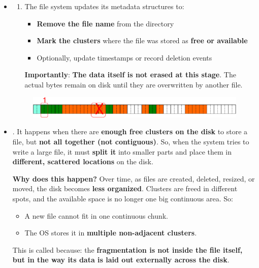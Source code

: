 \begin{itemize}
    \item {}
    \begin{enumerate}
        \item The file system updates its metadata structures to:
        \begin{itemize}
            \item \textbf{Remove the file name} from the directory
            \item \textbf{Mark the clusters} where the file was stored as \textbf{free or available}
            \item Optionally, update timestamps or record deletion events
        \end{itemize}
        \textcolor{Red2}{ \textbf{Importantly}}: \textbf{The data itself is not erased at this stage}. The actual bytes remain on disk until they are overwritten by another file.
    \end{enumerate}
    \begin{figure}[!htp]
        \centering
        \includegraphics[width=\textwidth]{img/files-4.pdf}
    \end{figure}
    
    \item {}. It happens when there are \textbf{enough free clusters on the disk} to store a file, but \textbf{not all together (not contiguous)}. So, when the system tries to write a large file, it must \textbf{split it} into smaller parts and place them in \textbf{different, scattered locations} on the disk.
    
    \textcolor{Green3}{ \textbf{Why does this happen?}} Over time, as files are created, deleted, resized, or moved, the disk becomes \textbf{less organized}. Clusters are freed in different spots, and the available space is no longer one big continuous area. So:
    \begin{itemize}
        \item A new file cannot fit in one continuous chunk.
        \item The OS stores it in \textbf{multiple non-adjacent clusters}.
    \end{itemize}
    This is called  because: the \textbf{fragmentation is not inside the file itself, but in the way its data is laid out externally across the disk}.


\end{itemize}
